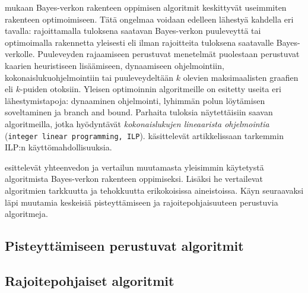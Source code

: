 \citet{scanagatta_survey_2019} mukaan Bayes-verkon rakenteen oppimisen algoritmit keskittyvät useimmiten rakenteen optimoimiseen. Tätä ongelmaa voidaan edelleen lähestyä kahdella eri tavalla:  rajoittamalla tuloksena saatavan Bayes-verkon puuleveyttä tai optimoimalla rakennetta yleisesti eli ilman rajoitteita tuloksena saatavalle Bayes-verkolle. Puuleveyden rajaamiseen perustuvat menetelmät puolestaan perustuvat kaarien heuristiseen lisäämiseen, dynaamiseen ohjelmointiin, kokonaislukuohjelmointiin tai puuleveydeltään $k$ olevien maksimaalisten graafien eli $k$-puiden otoksiin. Yleisen optimoinnin algoritmeille on esitetty useita eri lähestymistapoja: dynaaminen ohjelmointi, lyhimmän polun löytämisen soveltaminen ja branch and bound. Parhaita tuloksia näytettäisiin saavan algoritmeilla, jotka hyödyntävät \emph{kokonaislukujen lineaarista ohjelmointia} (\texttt{integer linear programming, ILP}). \citet{bartlett_integer_2017} käsittelevät artikkelissaan tarkemmin  ILP:n käyttömahdollisuuksia.

\citet{mittal_review_2011} esittelevät yhteenvedon ja vertailun muutamasta yleisimmin käytetystä algoritmista Bayes-verkon rakenteen oppimiseksi. Lisäksi he vertailevat algoritmien tarkkuutta ja tehokkuutta erikokoisissa aineistoissa. Käyn seuraavaksi läpi muutamia keskeisiä pisteyttämiseen ja rajoitepohjaisuuteen perustuvia algoritmeja.

\subsection{Pisteyttämiseen perustuvat algoritmit}
\subsection{Rajoitepohjaiset algoritmit}